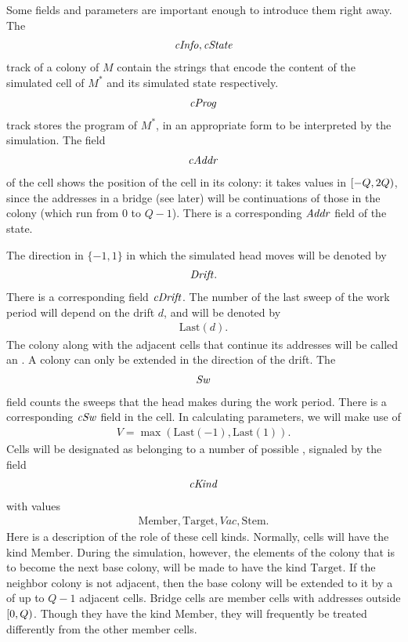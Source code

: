\documentclass[12pt]{memoir}
\newcommand{\fld}[1]{\ensuremath{\textit{#1\/}}}
\newcommand{\Vacant}{\mathit{Vac}}
\newcommand{\Q}{Q}
\renewcommand{\V}{V}
\newcommand{\Addr}{\fld{Addr}}
\newcommand{\cAddr}{\fld{cAddr}}
\newcommand{\Drift}{\fld{Drift}}
\newcommand{\cDrift}{\fld{cDrift}}
\newcommand{\cInfo}{\fld{cInfo}}
\newcommand{\cKind}{\fld{cKind}}
\newcommand{\cProg}{\fld{cProg}}
\newcommand{\cState}{\fld{cState}}
\newcommand{\Sweep}{\fld{Sw}}
\newcommand{\cSweep}{\fld{cSw}}
\newcommand{\Last}{\mathrm{Last}}
\newcommand{\Member}{\mathrm{Member}}
\newcommand{\Target}{\mathrm{Target}}
\newcommand{\Stem}{\mathrm{Stem}}
\begin{document}
Some fields and parameters are important enough to introduce them right away.
The 
\begin{align*}
   \cInfo,\cState
 \end{align*}
track of a colony of \( M \)
contain the strings that encode the content of the simulated cell of \( M^{*} \) and
its simulated state respectively.
\begin{align*}
 \cProg
 \end{align*}
track stores the program of \( M^{*} \), in an appropriate form 
to be interpreted by the simulation.
The field 
 \begin{align*}
  \cAddr
 \end{align*}
of the cell shows the position of the cell in its colony:
it takes values in \( \lint{-\Q}{2\Q} \), since the addresses in a bridge (see later)
will be continuations of those in the colony (which run from \( 0 \) to \( \Q-1 \)).
There is a corresponding \( \Addr \) field of the state.

The direction in \( \{-1,1\} \) in which the simulated head moves will be denoted by
 \begin{align*}
   \Drift.
 \end{align*}
There is a corresponding field \( \cDrift \).
The number of the last sweep of the work period will depend on the drift \( d \), 
and will be denoted by 
\begin{align}\label{eq:Last}
   \Last(d).
 \end{align}
The colony along with the adjacent cells that continue its addresses will be called
an .
A colony can only be extended in the direction of the drift.
The
 \begin{align*}
 \Sweep
 \end{align*}
field counts the sweeps that the head makes during the work period.
There is a corresponding \( \cSweep \) field in the cell.
In calculating parameters, we will make use of  
\begin{align}\label{eq:V}
   \V=\max(\Last(-1),\Last(1)).
 \end{align}
Cells will be designated as belonging to a number of possible , signaled by the
field 
\begin{align*}
     \cKind
 \end{align*}
with values
       \begin{align*}
          \Member, \Target, \Vacant, \Stem.
       \end{align*}
Here is a description of the role of these cell kinds.
Normally, cells will have the kind \( \Member \).
During the simulation, however, the elements of the colony that is to become
the next base colony, will be made to have the kind \( \Target \).
If the neighbor colony 
is not adjacent, then the base colony will be extended to it by 
a  of up to \( \Q-1 \) adjacent cells.
Bridge cells are member cells with addresses outside \( \lint{0}{\Q} \).
Though they have the kind \( \Member \), they will frequently be treated
differently from the other member cells.
\end{document}
